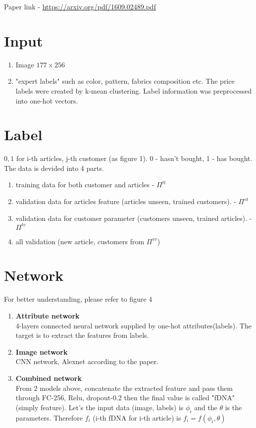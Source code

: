 \documentclass{article}
\begin{document}
Paper link - \url{https://arxiv.org/pdf/1609.02489.pdf}
\section*{Input}
\begin{enumerate}
\item Image $177\times256$
\item "expert labels" such as color, pattern, fabrics composition etc. The price labels were created by k-mean clustering. Label information was preprocessed into one-hot vectors.
\end{enumerate}
\section*{Label}
${0,1}$ for i-th articles, j-th customer (as figure 1). 0 - hasn't bought, 1 - has bought. The data is devided into 4 parts.
\begin{enumerate}
\item training data for both customer and articles - $\Pi^{tt}$
\item validation data for articles feature (articles unseen, trained customers). - $\Pi^{vt}$
\item validation data for customer parameter (customers unseen, trained articles). - $\Pi^{tv}$
\item all validation (new article, customers from $\Pi^{vv}$)
\end{enumerate}
\section*{Network}
For better understanding, please refer to figure 4\\
\begin{enumerate}
\item {\bf Attribute network}\\
4-layers connected neural network supplied by one-hot attributes(labels). The target is to extract the features from labels.
\item {\bf Image network}\\
CNN network, Alexnet according to the paper.
\item {\bf Combined network}\\
From 2 models above, concatenate the extracted feature and pass them through FC-256, Relu, dropout-0.2 then the final value is called "fDNA" (simply feature). Let's the input data (image, labels) is $\phi_i$ and the $\theta$ is the parameters. Therefore $f_i$ (i-th fDNA for i-th article) is $f_i=f(\phi_i, \theta)$
\end{enumerate}
\end{document}
